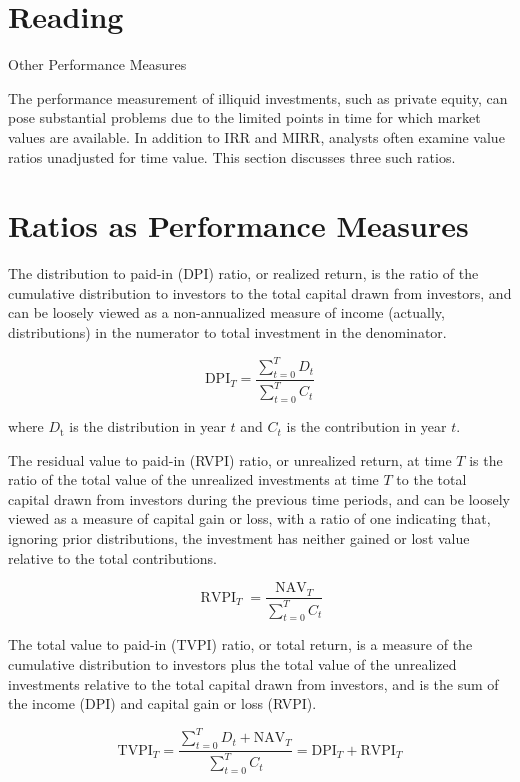\documentclass[11pt]{article}
\begin{document}
\section*{Reading}
Other Performance Measures

The performance measurement of illiquid investments, such as private equity, can pose substantial problems due to the limited points in time for which market values are available. In addition to IRR and MIRR, analysts often examine value ratios unadjusted for time value. This section discusses three such ratios.

\section*{Ratios as Performance Measures}
The distribution to paid-in (DPI) ratio, or realized return, is the ratio of the cumulative distribution to investors to the total capital drawn from investors, and can be loosely viewed as a non-annualized measure of income (actually, distributions) in the numerator to total investment in the denominator.


\begin{equation*}
\mathrm{DPI}_{T}=\frac{\sum_{t=0}^{T} D_{t}}{\sum_{t=0}^{T} C_{t}} \tag{1}
\end{equation*}


where $D_{\mathrm{t}}$ is the distribution in year $t$ and $C_{t}$ is the contribution in year $t$.

The residual value to paid-in (RVPI) ratio, or unrealized return, at time $T$ is the ratio of the total value of the unrealized investments at time $T$ to the total capital drawn from investors during the previous time periods, and can be loosely viewed as a measure of capital gain or loss, with a ratio of one indicating that, ignoring prior distributions, the investment has neither gained or lost value relative to the total contributions.


\begin{equation*}
\operatorname{RVPI}_{T}=\frac{\mathrm{NAV}_{T}}{\sum_{t=0}^{T} C_{t}} \tag{2}
\end{equation*}


The total value to paid-in (TVPI) ratio, or total return, is a measure of the cumulative distribution to investors plus the total value of the unrealized investments relative to the total capital drawn from investors, and is the sum of the income (DPI) and capital gain or loss (RVPI).


\begin{equation*}
\mathrm{TVPI}_{T}=\frac{\sum_{t=0}^{T} D_{t}+\mathrm{NAV}_{T}}{\sum_{t=0}^{T} C_{t}}=\mathrm{DPI}_{T}+\mathrm{RVPI}_{T} \tag{3}
\end{equation*}
\end{document}
